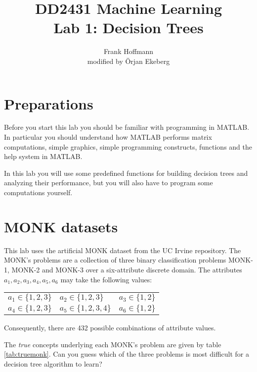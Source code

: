 \documentclass[11pt]{article}
\title{DD2431 Machine Learning\\Lab 1: Decision Trees}
\author{Frank Hoffmann\\modified by \"Orjan Ekeberg}
\begin{document}
\maketitle

\section{Preparations}

Before you start this lab you should be familiar with programming
in MATLAB.  In particular you should understand how MATLAB
performs matrix computations, simple graphics, simple programming
constructs, functions and the help system in MATLAB.

In this lab you will use some predefined functions for building
decision trees and analyzing their performance, but you will
also have to program some computations yourself.


\section{MONK datasets}

This lab uses the artificial MONK dataset from the UC Irvine repository.
The MONK's problems are a collection of three binary classification
problems MONK-1, MONK-2 and MONK-3 over a six-attribute discrete domain.
The attributes \(a_1, a_2, a_3, a_4, a_5, a_6\) may take the following values:

\begin{center}
  \begin{tabular}{lll}
    \(a_1 \in \{1, 2, 3\}\) &
    \(a_2 \in \{1, 2, 3\}\) &
    \(a_3 \in \{1, 2\}\)\\
    \(a_4 \in \{1, 2, 3\}\) &
    \(a_5 \in \{1, 2, 3, 4\}\) &
    \(a_6 \in \{1, 2\}\)\\
  \end{tabular}
\end{center}
Consequently, there are 432 possible combinations of attribute values.

The \emph{true} concepts underlying each MONK's problem are given by
table \ref{tab:truemonk}.
Can you guess which of the three problems is most difficult for a decision
tree algorithm to learn?
\end{document}
